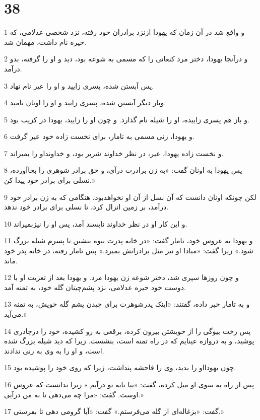 \chapter{38}

\par 1 و واقع شد در آن زمان که یهودا ازنزد برادران خود رفته، نزد شخصی عدلامی، که حیره نام داشت، مهمان شد.
\par 2 و درآنجا یهودا، دختر مرد کنعانی را که مسمی به شوعه بود، دید و او را گرفته، بدو درآمد.
\par 3 پس آبستن شده، پسری زایید و او را عیر نام نهاد.
\par 4 وبار دیگر آبستن شده، پسری زایید و او را اونان نامید.
\par 5 و باز هم پسری زاییده، او را شیله نام گذارد. و چون او را زایید، یهودا در کزیب بود. 
\par 6 و یهودا، زنی مسمی به تامار، برای نخست زاده خود عیر گرفت.
\par 7 و نخست زاده یهودا، عیر، در نظر خداوند شریر بود، و خداونداو را بمیراند.
\par 8 پس یهودا به اونان گفت: «به زن برادرت درآی، و حق برادر شوهری را بجاآورده، نسلی برای برادر خود پیدا کن.»
\par 9 لکن چونکه اونان دانست که آن نسل از آن او نخواهدبود، هنگامی که به زن برادر خود درآمد، بر زمین انزال کرد، تا نسلی برای برادر خود ندهد.
\par 10 و این کار او در نظر خداوند ناپسند آمد، پس او را نیزبمیراند.
\par 11 و یهودا به عروس خود، تامار گفت: «در خانه پدرت بیوه بنشین تا پسرم شیله بزرگ شود.» زیرا گفت: «مبادا او نیز مثل برادرانش بمیرد.» پس تامار رفته، در خانه پدر خود ماند.
\par 12 و چون روزها سپری شد، دختر شوعه زن یهودا مرد. و یهودا بعد از تعزیت او با دوست خود حیره عدلامی، نزد پشم‌چینان گله خود، به تمنه آمد.
\par 13 و به تامار خبر داده، گفتند: «اینک پدرشوهرت برای چیدن پشم گله خویش، به تمنه می‌آید.»
\par 14 پس رخت بیوگی را از خویشتن بیرون کرده، برقعی به رو کشیده، خود را درچادری پوشید، و به دروازه عینایم که در راه تمنه است، بنشست. زیرا که دید شیله بزرگ شده است، و او را به وی به زنی ندادند.
\par 15 چون یهودااو را بدید، وی را فاحشه پنداشت، زیرا که روی خود را پوشیده بود.
\par 16 پس از راه به سوی او میل کرده، گفت: «بیا تابه تو درآیم.» زیرا ندانست که عروس اوست. گفت: «مرا چه می‌دهی تا به من درآیی.»
\par 17 گفت: «بزغاله‌ای از گله می‌فرستم.» گفت: «آیا گرومی دهی تا بفرستی.»
